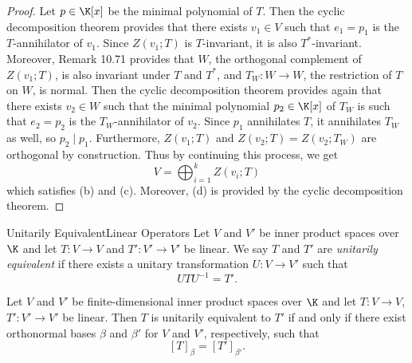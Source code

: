 \documentclass[linearalgebra]{subfiles}
\begin{document}
    \begin{proof}
        Let $p\in\K[x]$ be the minimal polynomial of $T$. Then the cyclic decomposition theorem provides that there exists $v_1\in V$ such that $e_1=p_1$ is the $T$-annihilator of $v_1$. Since $Z\left( v_1;T \right)$ is $T$-invariant, it is also $T^{*} $-invariant. Moreover, Remark 10.71 provides that $W$, the orthogonal complement of $Z\left( v_1;T \right)$, is also invariant under $T$ and $T^{*}$, and $T_W:W\to W$, the restriction of $T$ on $W$, is normal. Then the cyclic decomposition theorem provides again that there exists $v_2\in W$ such that the minimal polynomial $p_2\in\K[x]$ of $T_W$ is such that $e_2=p_2$ is the $T_W$-annihilator of $v_2$. Since $p_1$ annihilates $T$, it annihilates $T_W$ as well, so $p_2\mid p_1$. Furthermore, $Z\left( v_1;T \right)$ and $Z\left( v_2;T \right) = Z\left( v_2;T_W \right)$ are orthogonal by construction. Thus by continuing this process, we get
        \begin{equation*}
            V = \bigoplus^{k}_{i=1} Z\left( v_i;T \right)
        \end{equation*}
        which satisfies (b) and (c). Moreover, (d) is provided by the cyclic decomposition theorem.
    \end{proof}

    \begin{definition}{Unitarily Equivalent}{Linear Operators}
        Let $V$ and $V'$ be inner product spaces over $\K$ and let $T:V\to V$ and $T':V'\to V'$ be linear. We say $T$ and $T'$ are \emph{unitarily equivalent} if there exists a unitary transformation $U:V\to V'$ such that
        \begin{equation*}
            UTU^{-1} = T'.
        \end{equation*}
    \end{definition}

    \clearpage
    \begin{prop}{}
        Let $V$ and $V'$ be finite-dimensional inner product spaces over $\K$ and let $T:V\to V$, $T':V'\to V'$ be linear. Then $T$ is unitarily equivalent to $T'$ if and only if there exist orthonormal bases $\beta$ and $\beta'$ for $V$ and $V'$, respectively, such that
        \begin{equation*}
            \left[ T \right] _\beta = \left[ T' \right] _{\beta'}.
        \end{equation*}
    \end{prop}
\end{document}
